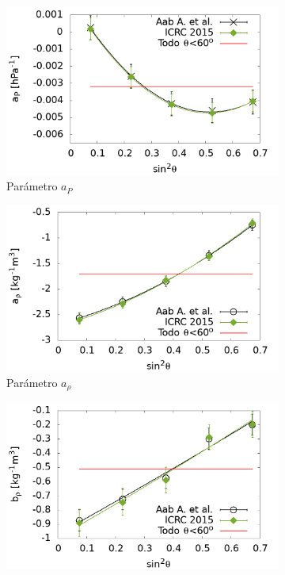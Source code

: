 					\begin{figure}[H]
        				\begin{subfigure}[b]{0.5\textwidth}
        				\includegraphics[width=\linewidth]{Graphs/params/ap_ICRC_2015_above_1EeV.png}
						\caption{Parámetro $a_P$ }
						\label{fig:ap_2015}
        				\end{subfigure}%
        				\hspace{\fill}
        				\begin{subfigure}[b]{0.5\textwidth}
        				\includegraphics[width=\linewidth]{Graphs/params/arho_ICRC_2015_above_1EeV.png}
						\caption{Parámetro $a_{\rho}$ }
						\label{fig:arho_2015}
        				\end{subfigure}%
        				\hspace{\fill}
        				\begin{subfigure}[b]{\textwidth}
        				\centering
        				\includegraphics[width=0.5\linewidth]{Graphs/params/brho_ICRC_2015_above_1EeV.png}

\end{subfigure}
\end{figure}

